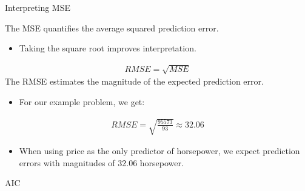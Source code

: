 \documentclass[10pt]{beamer}\usepackage[]{graphicx}\usepackage[]{color}
\begin{document}

\begin{frame}{Interpreting MSE}



  The MSE quantifies the average squared prediction error.
  \begin{itemize}
  \item Taking the square root improves interpretation.
  \end{itemize}
  \begin{align*}
    RMSE = \sqrt{MSE}
  \end{align*}
  The RMSE estimates the magnitude of the expected prediction error.
  \begin{itemize}
  \item For our example problem, we get:
  \end{itemize}
  \begin{align*}
    RMSE = \sqrt{\frac{95573}{93}} \approx
    32.06
  \end{align*}
  \begin{itemize}
  \item When using price as the only predictor of horsepower, we expect
    prediction errors with magnitudes of 32.06 horsepower.
  \end{itemize}

\end{frame}


\begin{frame}{AIC}

\end{frame}



\watermarkoff %
\end{document}
